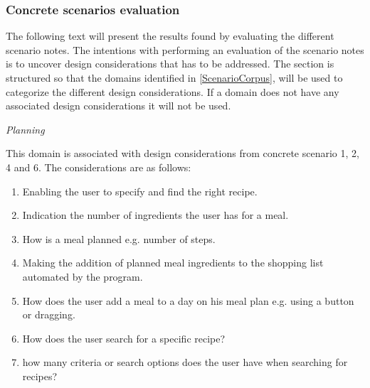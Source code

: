 \subsubsection{Concrete scenarios evaluation} 
The following text will present the results found by evaluating the different scenario notes. The intentions with performing an evaluation of the scenario notes is to uncover design considerations that has to be addressed. The section is structured so that the domains identified in \cref{ScenarioCorpus}, will be used to categorize the different design considerations. If a domain does not have any associated design considerations it will not be used.  

\emph{Planning}

This domain is associated with design considerations from concrete scenario 1, 2, 4 and 6. The considerations are as follows:

\begin{enumerate}
	\item Enabling the user to specify and find the right recipe.	
	\item Indication the number of ingredients the user has for a meal.
	\item How is a meal planned e.g. number of steps.
	\item Making the addition of planned meal ingredients to the shopping list automated by the program.
	\item How does the user add a meal to a day on his meal plan e.g. using a button or dragging.
	\item How does the user search for a specific recipe?
	\item how many criteria or search options does the user have when searching for recipes?
\end{enumerate}




